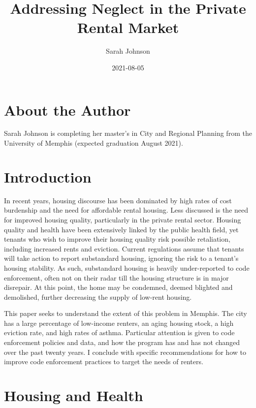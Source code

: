 \documentclass[
  openany]{book}
\title{Addressing Neglect in the Private Rental Market}
\author{Sarah Johnson}
\date{2021-08-05}
\begin{document}
\maketitle

{
\setcounter{tocdepth}{1}
\tableofcontents
}
\hypertarget{about-the-author}{%
\chapter*{About the Author}\label{about-the-author}}

Sarah Johnson is completing her master's in City and Regional Planning from the University of Memphis (expected graduation August 2021).

\hypertarget{intro}{%
\chapter{Introduction}\label{intro}}

In recent years, housing discourse has been dominated by high rates of cost burdenship and the need for affordable rental housing. Less discussed is the need for improved housing quality, particularly in the private rental sector. Housing quality and health have been extensively linked by the public health field, yet tenants who wish to improve their housing quality risk possible retaliation, including increased rents and eviction. Current regulations assume that tenants will take action to report substandard housing, ignoring the risk to a tenant's housing stability. As such, substandard housing is heavily under-reported to code enforcement, often not on their radar till the housing structure is in major disrepair. At this point, the home may be condemned, deemed blighted and demolished, further decreasing the supply of low-rent housing.

This paper seeks to understand the extent of this problem in Memphis. The city has a large percentage of low-income renters, an aging housing stock, a high eviction rate, and high rates of asthma. Particular attention is given to code enforcement policies and data, and how the program has and has not changed over the past twenty years. I conclude with specific recommendations for how to improve code enforcement practices to target the needs of renters.

\hypertarget{housing-and-health}{%
\chapter{Housing and Health}\label{housing-and-health}}
\end{document}
